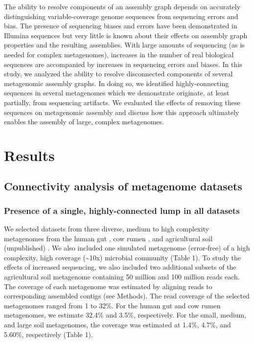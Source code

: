 \documentclass[11pt]{article} %
\begin{document}
The ability to resolve components of an assembly graph depends on accurately distinguishing variable-coverage genome sequences from sequencing errors and bias.  The presence of sequencing biases and errors have been demonstrated in Illumina sequences \cite{Harismendy:2009p228,Hoffmann:2009p1027,Nakamura:2011p741} but very little is known about their effects on assembly graph properties and the resulting assemblies.  With large amounts of sequencing (as is needed for complex metagenomes), increases in the number of real biological sequences are accompanied by increases in sequencing errors and biases.  In this study, we analyzed the ability to resolve disconnected components of several metagenomic assembly graphs.  In doing so, we identified highly-connecting sequences in several metagenomes which we demonstrate originate, at least partially, from sequencing artifacts.  We evaluated the effects of removing these sequences on metagenomic assembly and discuss how this approach ultimately enables the assembly of large, complex metagenomes.  

\section{Results}

\subsection{Connectivity analysis of metagenome datasets}

\subsubsection{Presence of a single, highly-connected lump in all datasets}
We selected datasets from three diverse, medium to high complexity metagenomes from the human gut \cite{Qin:2010p189}, cow rumen \cite{Hess:2011p686}, and agricultural soil (unpublished) . We also included one simulated metagenome (error-free) of a high complexity, high coverage (\textasciitilde{}10x) microbial community \cite{Pignatelli:2011p742} (Table 1). To study the effects of increased sequencing, we also included two additional subsets of the agricultural soil metagenome containing 50 million and 100 million reads each.   The coverage of each metagenome was estimated by aligning reads to corresponding assembled contigs (see Methods).  The read coverage of the selected metagenomes ranged from 1 to 32\%.   For the human gut and cow rumen metagenomes, we estimate 32.4\% and 3.5\%, respectively.  For the small, medium, and large soil metagenomes, the coverage was estimated at 1.4\%, 4.7\%, and 5.60\%, respectively (Table 1).  
\end{document}
